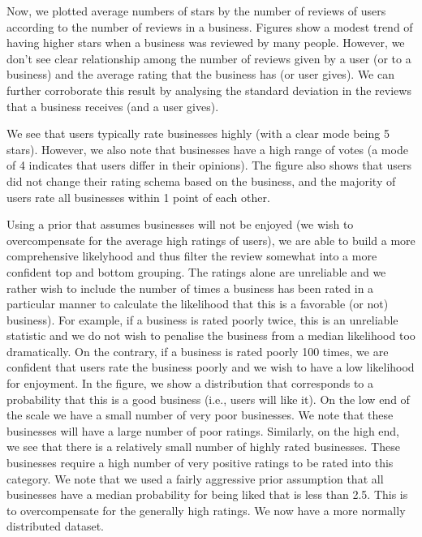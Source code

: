 \documentclass[11pt]{article}
\begin{document}
\par Now, we plotted average numbers of stars by the number of reviews of users according to the number of reviews in a business. Figures show a modest trend of having higher stars when a business was reviewed by many people. However, we don't see clear relationship among the number of reviews given by a user (or to a business) and the average rating that the business has (or user gives). We can further corroborate this result by analysing the standard deviation in the reviews that a business receives (and a user gives). 

\par We see that users typically rate businesses highly (with a clear mode being 5 stars). However, we also note that businesses have a high range of votes (a mode of 4 indicates that users differ in their opinions). The figure also shows that users did not change their rating schema based on the business, and the majority of users rate all businesses within 1 point of each other. 

\par Using a prior that assumes businesses will not be enjoyed (we wish to overcompensate for the average high ratings of users), we are able to build a more comprehensive likelyhood and thus filter the review somewhat into a more confident top and bottom grouping. The ratings alone are unreliable and we rather wish to include the number of times a business has been rated in a particular manner to calculate the likelihood that this is a favorable (or not) business). For example, if a business is rated poorly twice, this is an unreliable statistic and we do not wish to penalise the business from a median likelihood too dramatically. On the contrary, if a business is rated poorly 100 times, we are confident that users rate the business poorly and we wish to have a low likelihood for enjoyment. In the figure, we show a distribution that corresponds to a probability that this is a good business (i.e., users will like it). On the low end of the scale we have a small number of very poor businesses. We note that these businesses will have a large number of poor ratings. Similarly, on the high end, we see that there is a relatively small number of highly rated businesses. These businesses require a high number of very positive ratings to be rated into this category. We note that we used a fairly aggressive prior assumption that all businesses have a median probability for being liked that is less than 2.5. This is to overcompensate for the generally high ratings. We now have a more normally distributed dataset.
\end{document}
